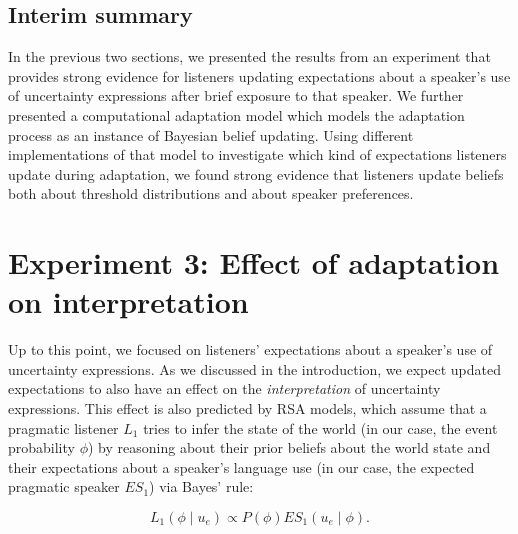 \documentclass[man, floatsintext]{apa6}
\begin{document}
%

\subsection{Interim summary}

In the previous two sections, we presented the results from an experiment that provides strong evidence for
listeners updating expectations about a speaker's use of uncertainty expressions after brief
exposure to that speaker. We further presented a computational adaptation model which models the adaptation
process as an instance of Bayesian belief updating. Using different implementations
of that model to investigate which kind of expectations listeners update during adaptation, we found strong evidence that listeners update beliefs both about  threshold distributions and 
 about speaker preferences.

\section{Experiment 3: Effect of adaptation on interpretation}
\label{sec:exp-model-interpretation}


Up to this point, we focused on listeners' expectations about a speaker's use of uncertainty expressions. As we discussed
in the introduction, we expect updated expectations to also have an effect on the \emph{interpretation} of uncertainty expressions. This
effect is also predicted by RSA models,  which assume that a pragmatic listener $L_1$ tries to infer the state of the world (in our case, the event probability $\phi$) by reasoning
about their prior beliefs about the world state and their expectations about a speaker's language use (in our case, the expected pragmatic speaker $ES_{1}$) via Bayes' rule:

$$ L_1(\phi \mid u_e) \propto P(\phi) ES_1(u_e \mid \phi).$$
\end{document}
